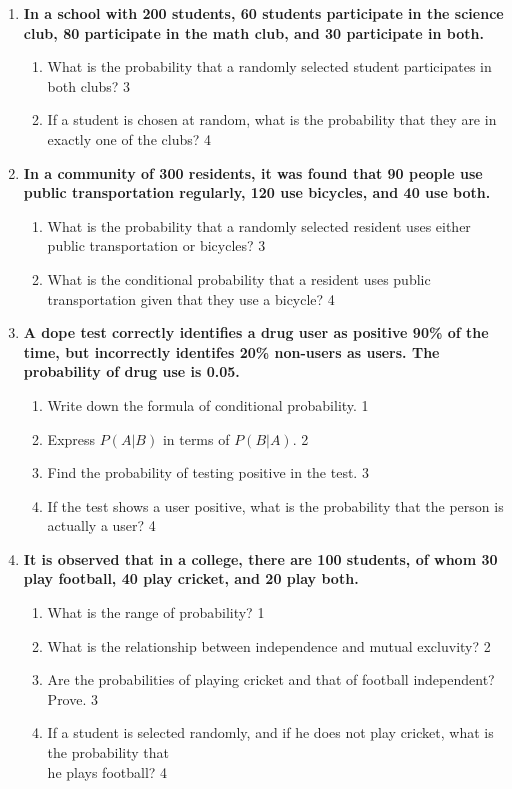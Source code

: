 \documentclass[a4paper,oneside, margin=1.4in]{book}
\begin{document}
\begin{enumerate}
\item
  \textbf{In a school with 200 students, 60 students participate in the science 
  club, 80 participate in the math club, and 30 participate in both.}
 
  \begin{enumerate}
    \item
    	What is the probability that a randomly selected student participates in both clubs? \hfill 3
    \item
    	If a student is chosen at random, what is the probability that they are in exactly one of the clubs? \hfill 4
  \end{enumerate}

\item
  \textbf{In a community of 300 residents, it was found that 90 people use public transportation regularly, 120 use bicycles, and 40 use both.}
 
  \begin{enumerate}
    \item
    	What is the probability that a randomly selected resident uses either public transportation or bicycles? \hfill 3
    \item
    	What is the conditional probability that a resident uses public transportation given that they use a bicycle? \hfill 4
  \end{enumerate}

  
  \item
	  \textbf{A dope test correctly identifies a drug user as positive 90\%  of the time, but incorrectly identifes 20\% non-users as users. The probability of drug use is 0.05.} 
  
  \begin{enumerate}
    \item
	Write down the formula of conditional probability. \hfill 1
    \item
	Express $P(A|B)$ in terms of $P(B|A)$. \hfill 2
    \item  
	Find the probability of testing positive in the test. \hfill 3
    \item
	If the test shows a user positive, what is the probability that the person is actually a user? \hfill 4
  \end{enumerate}
  
  \item
  \textbf{It is observed that in a college, there are 100 students, of whom 30 play football, 40 play cricket, and 20 play both.}
 
  \begin{enumerate}
    \item
	What is the range of probability? \hfill 1
    \item
    	What is the relationship between independence and mutual excluvity?  \hfill 2
    \item
    	Are the probabilities of playing cricket and that of football independent? Prove. \hfill 3
     \item
     	If a student is selected randomly, and if he does not play cricket, what is the probability that \\ he plays football? \hfill 4
  \end{enumerate}
  

\end{enumerate}
\end{document}

